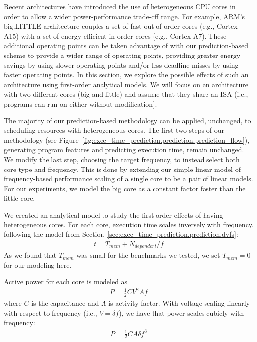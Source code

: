 Recent architectures have introduced the use of heterogeneous CPU cores in
order to allow a wider power-performance trade-off range. For example, ARM's
big.LITTLE architecture couples a set of fast out-of-order cores (e.g.,
Cortex-A15) with a set of energy-efficient in-order cores (e.g., Cortex-A7).
These additional operating points can be taken advantage of with our
prediction-based scheme to provide a wider range of operating points, providing
greater energy savings by using slower operating points and/or less deadline
misses by using faster operating points. In this section, we explore the
possible effects of such an architecture using first-order analytical models.
We will focus on an architecture with two different cores (big and little) and
assume that they share an ISA (i.e., programs can run on either without
modification).

The majority of our prediction-based methodology can be applied, unchanged, to
scheduling resources with heterogeneous cores. The first two steps of our
methodology (see
Figure~\ref{fig:exec_time_prediction.prediction.prediction_flow}), generating
program features and predicting execution time, remain unchanged. We modify
the last step, choosing the target frequency, to instead select both core type and
frequency.  This is done by extending our simple linear model of
frequency-based performance scaling of a single core to be a pair of linear
models. For our experiments, we model the big core as a constant factor faster
than the little core.

We created an analytical model to study the first-order effects of having
heterogeneous cores. For each core, execution time scales inversely with
frequency, following the model from
Section~\ref{sec:exec_time_prediction.prediction.dvfs}:
\begin{align*}
  t = T_{mem} + N_{dependent}/f
\end{align*}
As we found that $T_{mem}$ was small for the benchmarks we tested, we set $T_{mem}
= 0$ for our modeling here.

Active power for each core is modeled as
\begin{align*}
  P = \frac{1}{2}CV^2Af
\end{align*}
where $C$ is the capacitance and $A$ is activity factor. With voltage scaling
linearly with respect to frequency (i.e., $V = \delta f$), we have that power
scales cubicly with frequency:
\begin{align*}
  P = \frac{1}{2}CA\delta f^3
\end{align*}

